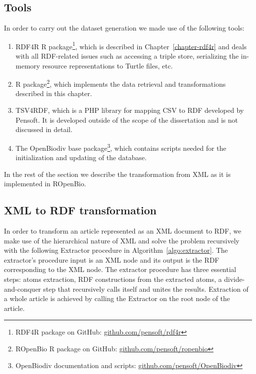 \subsection{Tools}

In order to carry out the dataset generation we made use of the following tools:

\begin{enumerate}
\item RDF4R R package\footnote{RDF4R package on GitHub: \href{https://github.com/pensoft/rdf4r}{github.com/pensoft/rdf4r}}, which is described in Chapter~\ref{chapter-rdf4r} and deals with all RDF-related issues such as accessing a triple store, serializing the in-memory resource representations to Turtle files, etc.
\item {} R package\footnote{ROpenBio R package on GitHub: \href{https://github.com/pensoft/ropenbio}{github.com/pensoft/ropenbio}}, which implements the data retrieval and transformations described in this chapter.
\item{TSV4RDF, which is a PHP library for mapping CSV to RDF developed by Pensoft. It is developed outside of the scope of the dissertation and is not discussed in detail.}
\item{The OpenBiodiv base package\footnote{OpenBiodiv documentation and scripts: \href{https://github.com/pensoft/OpenBiodiv}{github.com/pensoft/OpenBiodiv}}, which contains scripts needed for the initialization and updating of the database.}
\end{enumerate}

In the rest of the section we describe the transformation from XML as it is implemented in ROpenBio.

\subsection{XML to RDF transformation}

In order to transform an article represented as an XML document to RDF, we make use of the hierarchical nature of XML and solve the problem recursively with the following Extractor procedure in Algorithm~\ref{algo:extractor}. The extractor's procedure input is an XML node and its output is the RDF corresponding to the XML node. The extractor procedure has three essential steps: atoms extraction, RDF constructions from the extracted atoms, a divide-and-conquer step that recursively calls itself and unites the results. Extraction of a whole article is achieved by calling the Extractor on the root node of the article.


